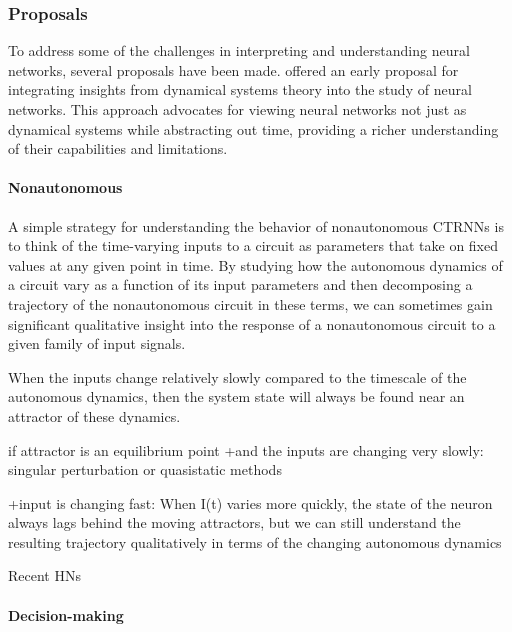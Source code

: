\documentclass{scrartcl}
\theoremstyle{definition}
\theoremstyle{remark}
\begin{document}
\subsubsection{Proposals}
To address some of the challenges in interpreting and understanding neural networks, several proposals have been made. \cite{casey1996} offered an early proposal for integrating insights from dynamical systems theory into the study of neural networks. This approach advocates for viewing neural networks not just as dynamical systems while abstracting out time, providing a richer understanding of their capabilities and limitations.


\paragraph{Nonautonomous}
A simple strategy for understanding the behavior of nonautonomous CTRNNs is to think of the time-varying inputs to a circuit as parameters that take on fixed values at any given point in time. \citep{beer1995ctrnn}
By studying how the autonomous dynamics of a circuit vary as a function of its input parameters and then decomposing a trajectory of the nonautonomous circuit in these terms, we can sometimes gain significant qualitative insight into the response of a nonautonomous circuit to a given family of input signals.


When the inputs change relatively slowly compared to the timescale of the autonomous dynamics, then the system state will always be found near an attractor of these dynamics.

if attractor is an equilibrium point 
+and the inputs are changing very slowly: singular perturbation or quasistatic methods \citep{hoppensteadt2012weakly,hoppensteadt2013analysis}

+input is changing fast: 
When I(t) varies more quickly, the state of the neuron always lags behind the moving attractors, but we can still understand the resulting trajectory qualitatively in terms of the changing autonomous dynamics





Recent HNs
\citep{bernstein2017markov}
\citep{ramsauer2020hopfield}
\citep{haputhanthri2023cue}


\paragraph{Decision-making}
\citep{zoltowski2020unifying, zoltowski2020general}
\end{document}
